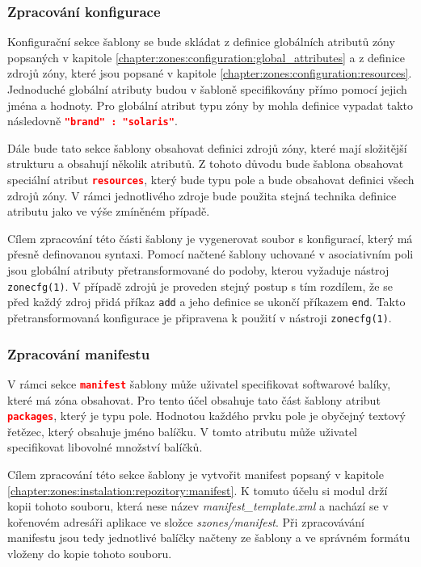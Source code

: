 \subsubsection{Zpracování konfigurace}
\label{chapter:implementation:szones:template:configuration}
Konfigurační sekce šablony se bude skládat z definice globálních atributů zóny popsaných v kapitole \ref{chapter:zones:configuration:global_attributes}
a z definice zdrojů zóny, které jsou popsané v kapitole \ref{chapter:zones:configuration:resources}. Jednoduché globální atributy
budou v šabloně specifikovány přímo pomocí jejich jména a hodnoty. Pro globální atribut typu zóny by mohla definice vypadat 
takto následovně \lstinline[language=json]{"brand" : "solaris"}.

Dále bude tato sekce šablony obsahovat definici zdrojů zóny, které mají složitější strukturu a obsahují několik atributů. Z tohoto
důvodu bude šablona obsahovat speciální atribut \lstinline[language=json]{resources}, který bude typu pole a bude obsahovat definici
všech zdrojů zóny. V rámci jednotlivého zdroje bude použita stejná technika definice atributu jako ve výše zmíněném případě.

Cílem zpracování této části šablony je vygenerovat soubor s konfigurací, který má přesně definovanou syntaxi. Pomocí načtené
šablony uchované v asociativním poli jsou globální atributy přetransformované do podoby, kterou vyžaduje nástroj \verb|zonecfg(1)|.
V případě zdrojů je proveden stejný postup s tím rozdílem, že se před každý zdroj přidá příkaz \verb|add| a jeho definice
se ukončí příkazem \verb|end|. Takto přetransformovaná konfigurace je připravena k použití v nástroji \verb|zonecfg(1)|.
\subsubsection{Zpracování manifestu}
\label{chapter:implementation:szones:template:manifest}
V rámci sekce  \lstinline[language=json]{manifest} šablony může uživatel specifikovat softwarové balíky, které má zóna obsahovat.
Pro tento účel obsahuje tato část šablony atribut \lstinline[language=json]{packages}, který je typu pole. Hodnotou každého
prvku pole je obyčejný textový řetězec, který obsahuje jméno balíčku. V tomto atributu může uživatel specifikovat libovolné
množství balíčků. 

Cílem zpracování této sekce šablony je vytvořit manifest popsaný v kapitole \ref{chapter:zones:instalation:repozitory:manifest}.
K tomuto účelu si modul drží kopii tohoto souboru, která nese název \textit{manifest\_template.xml} a nachází se v kořenovém 
adresáři aplikace ve složce \textit{szones/manifest}. Při zpracovávání manifestu jsou tedy jednotlivé balíčky načteny ze šablony
a ve správném formátu vloženy do kopie tohoto souboru.
